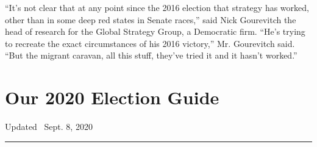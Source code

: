 ``It's not clear that at any point since the 2016 election that strategy
has worked, other than in some deep red states in Senate races,'' said
Nick Gourevitch the head of research for the Global Strategy Group, a
Democratic firm. ``He's trying to recreate the exact circumstances of
his 2016 victory,'' Mr. Gourevitch said. ``But the migrant caravan, all
this stuff, they've tried it and it hasn't worked.''

\hypertarget{our-2020-election-guide}{%
\section{Our 2020 Election Guide}\label{our-2020-election-guide}}

Updated ~Sept. 8, 2020

\begin{center}\rule{0.5\linewidth}{\linethickness}\end{center}

